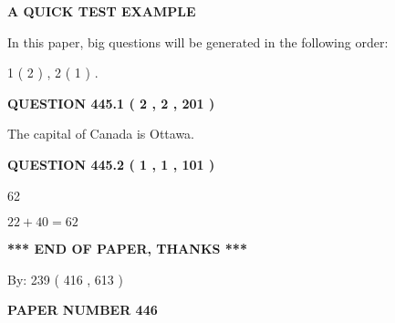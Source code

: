 \documentclass[12pt]{article}
\begin{document}
   
   
   
 \vspace{0.2in}
{\LARGE {\textbf{ A QUICK TEST EXAMPLE}}}
   
   
   
\vspace{0.2in}
   
In this paper, big questions will be generated in the following order: 
   
   
   1 ( 2 )
 ,
   2 ( 1 )
 .
  
\vspace{0.2in}
  
{\textbf{\Large{QUESTION
445.1 
 ( 2 , 2 , 201 )
}}}
  
  
 
 
\noindent{}
 
 
The capital of Canada is Ottawa.
 
 
 
 
  
\vspace{0.2in}
  
{\textbf{\Large{QUESTION
445.2 
 ( 1 , 1 , 101 )
}}}
  
  
 
 
\noindent{}

62
 
 
 
 
\noindent{}

$ %
22 +  %
40=   %
62$
 
 
   
   
 \vspace{0.2in}
 
   
   
   
   
\vspace{1.0in} 
{\textbf{\large{ *** END OF PAPER, THANKS *** }}} 
   
   
\hspace{1.0in} By: 
 239 ( 416 ,  613 )
   
   
   
   
\newpage 
\setcounter{page}{ 
   446001 } 
   
   
   
   
 {\textbf{ \Large{ PAPER NUMBER  446  }}}
   
\end{document}
